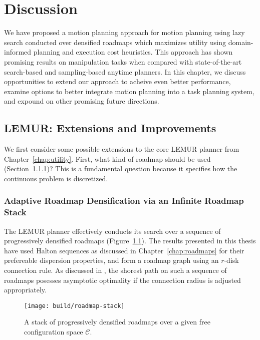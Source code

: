\chapter{Discussion}



We have proposed a motion planning approach for motion planning
using lazy search conducted over densified roadmaps
which maximizes utility using domain-informed
planning and execution cost heuristics.
This approach has shown promising results on manipulation tasks
when compared with state-of-the-art
search-based and sampling-based anytime planners.
In this chapter,
we discuss opportunities to extend our approach to acheive even
better performance,
examine options to better integrate motion planning into a
task planning system,
and expound on other promising future directions.

\section{LEMUR: Extensions and Improvements}

We first consider some possible extensions to the core
LEMUR planner from Chapter~\ref{chap:utility}.
First, what kind of roadmap should be used
(Section~\ref{sec:discussion:disc})?
This is a fundamental question because it specifies how the
continuous problem is discretized.

\subsection{Adaptive Roadmap Densification via an Infinite Roadmap Stack}
\label{sec:discussion:disc}
The LEMUR planner effectively conducts its search over a sequence of
progressively densified roadmaps
(Figure~\ref{fig:discussion:roadmap-stack}).
The results presented in this thesis have used Halton sequences
as discussed in Chapter~\ref{chap:roadmaps}
for their prefereable dispersion properties,
and form a roadmap graph using an $r$-disk connection rule.
As discussed in \citep{janson2015deterministicsampling},
the shorest path on such a sequence of roadmaps
posesses asymptotic optimality if the connection radius is adjusted
appropriately.

\begin{figure}
   \centering
   \texttt{[image: build/roadmap-stack]}
   \caption{A stack of progressively densified roadmaps
      over a given free configuration space $\mathcal{C}$.}
   \label{fig:discussion:roadmap-stack}
\end{figure}

